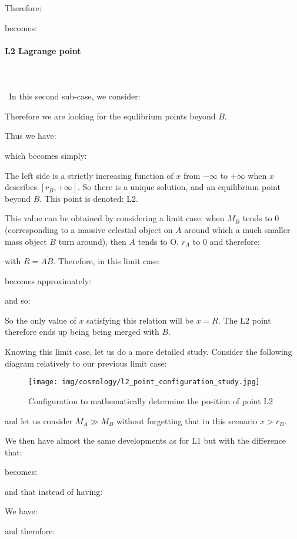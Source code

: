 	Therefore:
	
	becomes:
	
	
	\paragraph{L2 Lagrange point}\mbox{}\\\\\
	In this second sub-case, we consider:
	
	Therefore we are looking for the equlibrium points beyond $B$.

	Thus we have:
	
	which becomes simply:
	
	The left side is a strictly increasing function of $x$ from $-\infty$ to $+\infty$ when $x$ describes $[r_B,+\infty]$. So there is a unique solution, and an equilibrium point beyond $B$. This point is denoted: L2.

	This value can be obtained by considering a limit case: when $M_B$ tends to $0$ (corresponding to a massive celestial object on $A$ around which a much smaller mass object $B$ turn around), then $A$ tends to O, $r_A$ to $0$ and therefore:
	
	with $R=\overline{AB}$. Therefore, in this limit case:
	
	becomes approximately:
	
	and so:
	
	So the only value of $x$ satisfying this relation will be $x=R$. The L2 point therefore ends up being being merged with $B$.

	Knowing this limit case, let us do a more detailed study. Consider the following diagram relatively to our previous limit case:
	\begin{figure}[H]
		\begin{center}
		\texttt{[image: img/cosmology/l2\_point\_configuration\_study.jpg]}
		\end{center}	
		\caption[]{Configuration to mathematically determine the position of point L2}
	\end{figure}
	and let us consider $M_A\gg M_B$ without forgetting that in this scenario $x>r_B$.

	We then have almost the same developments as for L1 but with the difference that:
	
	becomes:
	
	and that instead of having:
	
	We have:
	
	and therefore:
	
